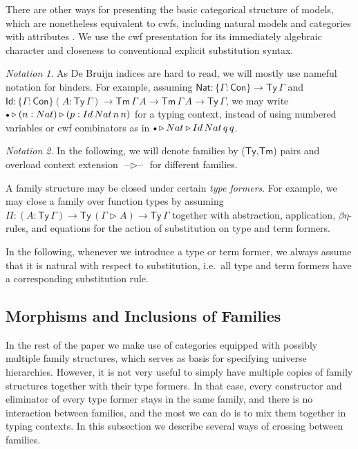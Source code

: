 \documentclass[a4paper,UKenglish,cleveref, autoref, thm-restate]{lipics-v2021}
\theoremstyle{remark}
\newtheorem{notation}{Notation}
\theoremstyle{definition}
\newcommand{\Con}{\mathsf{Con}}
\newcommand{\Ty}{\mathsf{Ty}}
\newcommand{\Tm}{\mathsf{Tm}}
\newcommand{\emptycon}{\scaleobj{.75}\bullet}
\newcommand{\ext}{\triangleright}
\newcommand{\blank}{\mathord{\hspace{1pt}\text{--}\hspace{1pt}}}
\newcommand{\q}{\mathsf{q}}
\newcommand{\Id}{\mathsf{Id}}
\newcommand{\Nat}{\mathsf{Nat}}
\begin{document}
There are other ways for presenting the basic categorical structure of models,
which are nonetheless equivalent to cwfs, including natural models
\cite{awodey18natural} and categories with attributes \cite{cartmellthesis}. We
use the cwf presentation for its immediately algebraic character and closeness
to conventional explicit substitution syntax.

\begin{notation}As De Bruijn indices are hard to read, we will mostly use
nameful notation for binders. For example, assuming $\Nat : \{\Gamma : \Con\}
\to \Ty\,\Gamma$ and $\Id : \{\Gamma : \Con\}(A : \Ty\,\Gamma) \to
\Tm\,\Gamma\,A \to \Tm\,\Gamma\,A \to \Ty\,\Gamma$, we may write $\emptycon \ext
(n : \Nat) \ext (p : \Id\,\Nat\,n\,n)$ for a typing context, instead of using
numbered variables or cwf combinators as in $\emptycon \ext \Nat \ext
\Id\,\Nat\,\q\,\q$.
\end{notation}

\begin{notation}
In the following, we will denote families by ($\Ty$,$\Tm$) pairs and overload context
extension $\blank\ext\blank$ for different families.
\end{notation}

A family structure may be closed under certain \emph{type formers}. For example,
we may close a family over function types by assuming $\Pi : (A : \Ty\,\Gamma)
\to \Ty\,(\Gamma\ext A) \to \Ty\,\Gamma$ together with abstraction, application,
$\beta\eta$-rules, and equations for the action of substitution on type and term
formers.

In the following, whenever we introduce a type or term former, we always assume
that it is natural with respect to substitution, i.e.\ all type and term formers
have a corresponding substitution rule.

\subsection{Morphisms and Inclusions of Families}
\label{sec:morphisms}

In the rest of the paper we make use of categories equipped with possibly
multiple family structures, which serves as basis for specifying universe
hierarchies. However, it is not very useful to simply have multiple copies of
family structures together with their type formers. In that case, every
constructor and eliminator of every type former stays in the same family, and
there is no interaction between families, and the most we can do is to mix them
together in typing contexts. In this subsection we describe several ways of
crossing between families.
\end{document}
